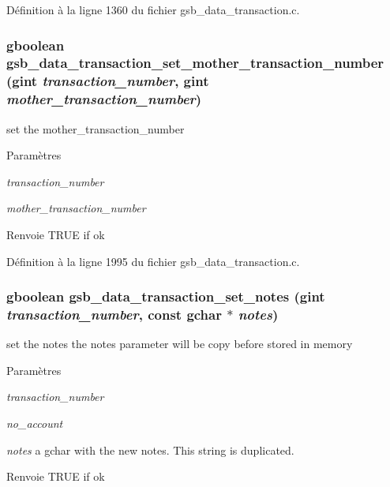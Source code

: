 Définition à la ligne 1360 du fichier gsb\_\-data\_\-transaction.c.

\subsubsection[{gsb\_\-data\_\-transaction\_\-set\_\-mother\_\-transaction\_\-number}]{\setlength{\rightskip}{0pt plus 5cm}gboolean gsb\_\-data\_\-transaction\_\-set\_\-mother\_\-transaction\_\-number (gint {\em transaction\_\-number}, \/  gint {\em mother\_\-transaction\_\-number})}\label{gsb__data__transaction_8h_abfffebad5a6949bd032c09311e3f995e}
set the mother\_\-transaction\_\-number


\begin{DoxyParams}{Paramètres}
\item[{\em transaction\_\-number}]\item[{\em mother\_\-transaction\_\-number}]\end{DoxyParams}
\begin{DoxyReturn}{Renvoie}
TRUE if ok 
\end{DoxyReturn}


Définition à la ligne 1995 du fichier gsb\_\-data\_\-transaction.c.

\subsubsection[{gsb\_\-data\_\-transaction\_\-set\_\-notes}]{\setlength{\rightskip}{0pt plus 5cm}gboolean gsb\_\-data\_\-transaction\_\-set\_\-notes (gint {\em transaction\_\-number}, \/  const gchar $\ast$ {\em notes})}\label{gsb__data__transaction_8h_ab503c0949e0aff8438156f760e20f85e}
set the notes the notes parameter will be copy before stored in memory 
\begin{DoxyParams}{Paramètres}
\item[{\em transaction\_\-number}]\item[{\em no\_\-account}]\item[{\em notes}]a gchar with the new notes. This string is duplicated. \end{DoxyParams}
\begin{DoxyReturn}{Renvoie}
TRUE if ok 
\end{DoxyReturn}


